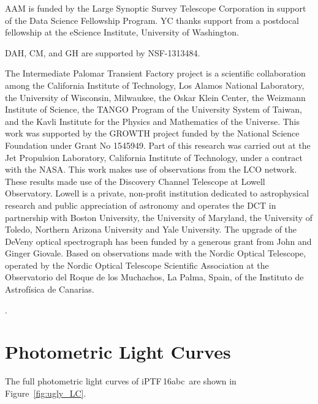 \documentclass[twocolumn]{aastex61}
\newcommand{\abc}{iPTF\,16abc}
\begin{document}
AAM is funded by the Large Synoptic Survey Telescope Corporation in support of
the Data Science Fellowship Program. YC thanks support from a postdocal
fellowship at the eScience Institute, University of Washington.

DAH, CM, and GH are supported by NSF-1313484.

The Intermediate Palomar Transient Factory project is a scientific collaboration among the California Institute of Technology, Los Alamos National Laboratory, the University of Wisconsin, Milwaukee, the Oskar Klein Center, the Weizmann Institute of Science, the TANGO Program of the University System of Taiwan, and the Kavli Institute for the Physics and Mathematics of the Universe. This work was supported by the GROWTH project funded by the National Science Foundation under Grant No 1545949. Part of this research was carried out at the Jet Propulsion Laboratory, California Institute of Technology, under a contract with the NASA. This work makes use of observations from the LCO network. These results made use of the Discovery Channel Telescope at Lowell Observatory. Lowell is a private, non-profit institution dedicated to astrophysical research and public appreciation of astronomy and operates the DCT in partnership with Boston University, the University of Maryland, the University of Toledo, Northern Arizona University and Yale University. The upgrade of the DeVeny optical spectrograph has been funded by a generous grant from John and Ginger Giovale. Based on observations made with the Nordic Optical Telescope, operated by the Nordic Optical Telescope Scientific Association at the Observatorio del Roque de los Muchachos, La Palma, Spain, of the Instituto de Astrof\'isica de Canarias.


.


\appendix

\section{Photometric Light Curves}

The full photometric light curves of \abc\ are shown in Figure~\ref{fig:ugly_LC}.
\end{document}
